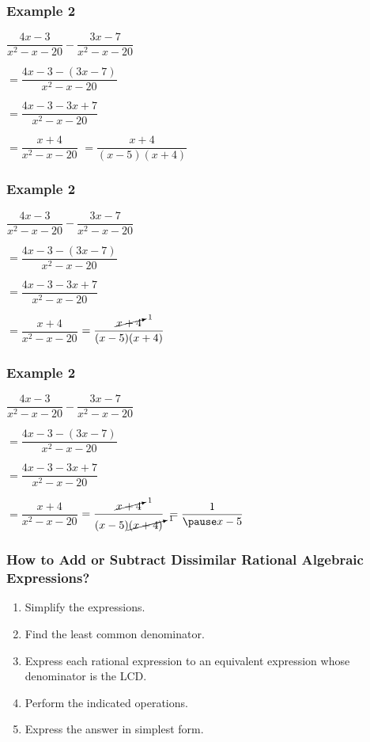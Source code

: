 \documentclass[14pt]{beamer}
\begin{document}
    \begin{frame}
    	\frametitle{Example 2}
    	$ \dfrac{4x - 3}{x^2 -x - 20} - \dfrac{3x - 7}{x^2 -x - 20} $ 
    	
    	\vspace{1em} $ = \dfrac{4x - 3 - (3x - 7)}{x^2 -x - 20} $ 
    	
    	\vspace{1em} $ = \dfrac{4x - 3- 3x + 7}{x^2 -x - 20} $ 
    	
    	\vspace{1em} $ = \dfrac{x + 4}{x^2 -x - 20} $ 
    	$ = \dfrac{x + 4}{(x - 5)(x + 4)} $ 
    \end{frame}

    \begin{frame}
    	\frametitle{Example 2}
    	$ \dfrac{4x - 3}{x^2 -x - 20} - \dfrac{3x - 7}{x^2 -x - 20} $ 
    	
    	\vspace{1em} $ = \dfrac{4x - 3 - (3x - 7)}{x^2 -x - 20} $ 
    	
    	\vspace{1em} $ = \dfrac{4x - 3- 3x + 7}{x^2 -x - 20} $ 
    	
    	\vspace{1em} $ = \dfrac{x + 4}{x^2 -x - 20} $ 
    	$ = \dfrac{\cancelto{1}{x + 4}}{(x - 5)(x  + 4)} $ 
    \end{frame}

    \begin{frame}
    	\frametitle{Example 2}
    	$ \dfrac{4x - 3}{x^2 -x - 20} - \dfrac{3x - 7}{x^2 -x - 20} $ 
    	
    	\vspace{1em} $ = \dfrac{4x - 3 - (3x - 7)}{x^2 -x - 20} $ 
    	
    	\vspace{1em} $ = \dfrac{4x - 3- 3x + 7}{x^2 -x - 20} $ 
    	
    	\vspace{1em} $ = \dfrac{x + 4}{x^2 -x - 20} $ 
    	$ = \dfrac{\cancelto{1}{x + 4}}{(x - 5)\cancelto{1}{(x  + 4)}} $ 
    	\pause \hspace{0.5em} $  = \dfrac{1}{\pause x-5} $ \pause \redcheck
    \end{frame}

    \begin{frame}
    	\frametitle{How to Add or Subtract Dissimilar Rational Algebraic Expressions?}
    	\begin{enumerate}
    		\item<1-> Simplify the expressions.
    		\item<2-> Find the least common denominator. 
    	    \item<3-> Express each rational expression to an equivalent expression whose denominator is the LCD.
    	    \item<4-> Perform the indicated operations.
    	    \item<5-> Express the answer in simplest form.
       	\end{enumerate}
    \end{frame}
\end{document}
